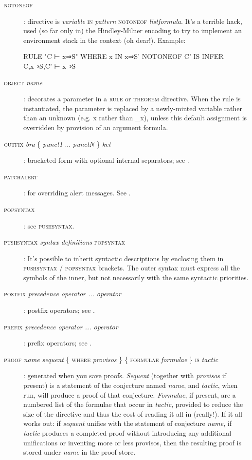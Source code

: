 \begin{description}
\item[\textsc{notoneof}]: directive is \textit{variable} \textsc{in} \textit{pattern} \textsc{notoneof} \textit{listformula}. It's a terrible hack, used (so far only in) the Hindley-Milner encoding to try to implement an environment stack in the context (oh dear!). Example:
\begin{japeish}
RULE "C ⊢ x⇒S" WHERE x IN x⇒S' NOTONEOF C' IS INFER C,x⇒S,C' ⊢ x⇒S
\end{japeish}

\item[\textsc{object} \textit{name}]: decorates a parameter in a \textsc{rule} or \textsc{theorem} directive. When the rule is instantiated, the parameter is replaced by a newly-minted variable rather than an unknown (e.g. x rather than \_x), unless this default assignment is overridden by provision of an argument formula.

\item[\textsc{outfix} \textit{bra} \{ \textit{punct1} ... \textit{punctN} \} \textit{ket}]: bracketed form with optional internal separators; see .

\item[\textsc{patchalert}]: for overriding alert messages. See .

\item[\textsc{popsyntax}]: see \textsc{pushsyntax}.

\item[\textsc{pushsyntax} \textit{syntax definitions} \textsc{popsyntax}]: It's possible to inherit  syntactic descriptions by enclosing them in \textsc{pushsyntax} / \textsc{popsyntax} brackets. The outer syntax must express all the symbols of the inner, but not necessarily with the same syntactic priorities.

\item[\textsc{postfix} \textit{precedence operator ... operator}]: postfix operators; see .

\item[\textsc{prefix} \textit{precedence operator ... operator}]: prefix operators; see .

\item[\textsc{proof} \textit{name sequent} \{ \textsc{where} \textit{provisos} \} \{ \textsc{formulae} \textit{formulae} \} \textsc{is} \textit{tactic}]: generated when you save proofs. \textit{Sequent} (together with \textit{provisos} if present) is a statement of the conjecture named \textit{name}, and \textit{tactic}, when run, will produce a proof of that conjecture. \textit{Formulae}, if present, are a numbered list of the formulae that occur in \textit{tactic}, provided to reduce the size of the directive and thus the cost of reading it all in (really!). If it all works out: if \textit{sequent} unifies with the statement of conjecture \textit{name}, if \textit{tactic} produces a completed proof without introducing any additional unifications or inventing more or less provisos, then the resulting proof is stored under \textit{name} in the proof store.


\end{description}
